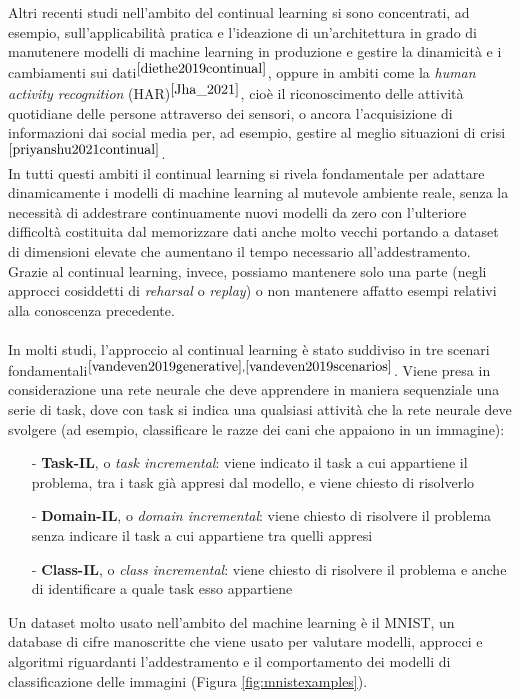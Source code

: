 Altri recenti studi nell'ambito del continual learning si sono concentrati, ad esempio, sull'applicabilità pratica e l'ideazione di un'architettura in grado di manutenere modelli di machine learning in produzione e gestire la dinamicità e i cambiamenti sui dati$^{\cite{diethe2019continual}}$, oppure in ambiti come la \textit{human activity recognition} (HAR)$^{\cite{Jha_2021}}$, cioè il riconoscimento delle attività quotidiane delle persone attraverso dei sensori, o ancora l'acquisizione di informazioni dai social media per, ad esempio, gestire al meglio situazioni di crisi$^{\cite{priyanshu2021continual}}$.\\
In tutti questi ambiti il continual learning si rivela fondamentale per adattare dinamicamente i modelli di machine learning al mutevole ambiente reale, senza la necessità di addestrare continuamente nuovi modelli da zero con l'ulteriore difficoltà costituita dal memorizzare dati anche molto vecchi portando a dataset di dimensioni elevate che aumentano il tempo necessario all'addestramento. Grazie al continual learning, invece, possiamo mantenere solo una parte (negli approcci cosiddetti di \textit{reharsal} o \textit{replay}) o non mantenere affatto esempi relativi alla conoscenza precedente.\\\\
In molti studi, l'approccio al continual learning è stato suddiviso in tre scenari fondamentali$^{\cite{vandeven2019generative},\cite{vandeven2019scenarios}}$. Viene presa in considerazione una rete neurale che deve apprendere in maniera sequenziale una serie di task, dove con task si indica una qualsiasi attività che la rete neurale deve svolgere (ad esempio, classificare le razze dei cani che appaiono in un immagine):
\begin{itemize}
    \item[-] \textbf{Task-IL}, o \textit{task incremental}: viene indicato il task a cui appartiene il problema, tra i task già appresi dal modello, e viene chiesto di risolverlo
    \item[-] \textbf{Domain-IL}, o \textit{domain incremental}: viene chiesto di risolvere il problema senza indicare il task a cui appartiene tra quelli appresi
    \item[-] \textbf{Class-IL}, o \textit{class incremental}: viene chiesto di risolvere il problema e anche di identificare a quale task esso appartiene
\end{itemize}
Un dataset molto usato nell'ambito del machine learning è il MNIST, un database di cifre manoscritte che viene usato per valutare modelli, approcci e algoritmi riguardanti l'addestramento e il comportamento dei modelli di classificazione delle immagini (Figura \ref{fig:mnistexamples}).
